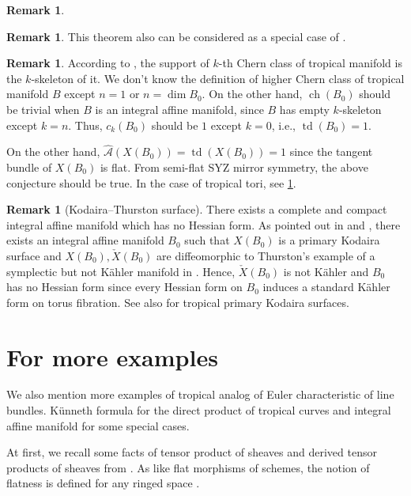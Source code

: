 \documentclass[a4paper,dvipdfmx,reqno,12pt]{amsart}
\theoremstyle{definition}
\newtheorem{Rmk}[Thm]{Remark}
\newcommand{\mcal}[1]{\mathcal{#1}}%
\newcommand{\opn}[1]{\operatorname{#1}}
\numberwithin{equation}{section}
\begin{document}
\begin{Rmk}

\end{Rmk}

\begin{Rmk} \label{rmk: integral_mirror}
This theorem also can be considered as a special case of \cite{MR4301560}.
\end{Rmk}

\begin{Rmk}

According to \cite[5.3]{mikhalkinTropicalGeometryIts2006},
the support of $k$-th Chern class of tropical manifold is 
the $k$-skeleton of it.
We don't know the definition of higher Chern class of tropical manifold $B$ except
$n=1$ or $n=\dim B_0$. 
On the other hand, $\opn{ch}(B_0)$ should be trivial when $B$ is
an integral affine manifold, since $B$ has empty
$k$-skeleton except $k=n$.
Thus, $c_{k}(B_0)$ should be $1$ except $k=0$, 
i.e., $\opn{td}(B_0)=1$. 

On the other hand, $\hat{\mcal{A}}(X(B_0))=\opn{td}(X(B_0))=1$
since the tangent bundle of $X(B_0)$ is flat.
    From semi-flat SYZ mirror symmetry, the above conjecture should be true. In the case of tropical tori, see \ref{}.
\end{Rmk}

\begin{Rmk}[{Kodaira--Thurston surface}]
There exists a complete and compact integral affine manifold
  which has no Hessian form.
As pointed out in \cite[Example 1.14]{grossMirrorSymmetryLogarithmic2006a}
and \cite[p.403]{MR1461965}, there exists an integral affine manifold
$B_0$ such that
$X(B_0)$ is a primary Kodaira surface and $X(B_0),\check{X}(B_0)$
are diffeomorphic to Thurston's example of a symplectic but
not K\"ahler manifold in \cite{MR402764}.
Hence, $\check{X}(B_0)$ is not K\"ahler and $B_0$ has no
Hessian form since every Hessian form on $B_0$ induces a 
standard K\"ahler form
on torus fibration.
See also \cite{MR1422337} for tropical primary Kodaira surfaces.
\end{Rmk}

\section{For more examples}
We also mention more examples of 
tropical analog of Euler characteristic of 
line bundles.
 K\"unneth formula for
the direct product of tropical curves and 
integral affine manifold for some special cases.

At first, we recall some facts of tensor product of sheaves 
and derived tensor products of sheaves from \cite{MR1299726}.
As like flat morphisms of schemes, the notion of flatness
is defined for any ringed space 
\cite[Definition 2.4.11]{MR1299726}.
\end{document}
